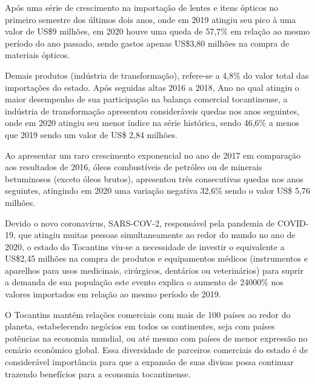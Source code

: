 \par Após uma série de crescimento na importação de lentes e itens ópticos no primeiro semestre dos últimos dois anos, onde em 2019 atingiu seu pico à uma valor de US\$9 milhões, em 2020 houve uma queda de 57,7\% em relação ao mesmo período do ano passado, sendo gastos apenas US\$3,80 milhões na compra de materiais ópticos.


\par Demais produtos (indústria de transformação), refere-se a 4,8\% do valor total das importações do estado. Após seguidas altas 2016 a 2018, Ano no qual atingiu o maior desempenho de sua participação na balança comercial tocantinense, a indústria de transformação apresentou consideráveis quedas nos anos seguintes, onde em 2020 atingiu seu menor índice na série histórica, sendo 46,6\% a menos que 2019 sendo um valor de US\$ 2,84 milhões.

\par Ao apresentar um raro crescimento exponencial no ano de 2017 em comparação aos resultados de 2016, óleos combustíveis de petróleo ou de minerais betuminosos (exceto óleos brutos), apresentou três consecutivas quedas nos anos seguintes, atingindo em 2020 uma variação negativa 32,6\% sendo o valor US\$ 5,76 milhões.


\par Devido o novo coronavírus, SARS-COV-2, responsável pela pandemia de COVID-19, que atingiu muitas pessoas simultaneamente ao redor do mundo no ano de 2020, o estado do Tocantins viu-se a necessidade de investir o equivalente a US\$2,45 milhões na compra de produtos e equipamentos médicos (instrumentos e aparelhos para usos medicinais, cirúrgicos, dentários ou veterinários) para suprir a demanda de sua população este evento explica o aumento de 24000\% nos valores importados em relação ao mesmo período de 2019.


\par O Tocantins mantém relações comerciais com mais de 100 países ao redor do planeta, estabelecendo negócios em todos os continentes, seja com países potências na economia mundial, ou até mesmo com países de menor expressão no cenário econômico global. Essa diversidade de parceiros comerciais do estado é de considerável importância para que a expansão de suas divisas possa continuar trazendo benefícios para a economia tocantinense.


